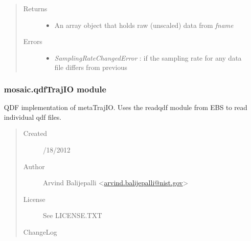 \documentclass[letterpaper,10pt,english]{sphinxmanual}
\begin{document}
\begin{fulllineitems}
\begin{fulllineitems}
\begin{quote}
\begin{description}
\begin{itemize}
\end{itemize}

\item[{Returns}] \leavevmode\begin{itemize}
\item {} 
An array object that holds raw (unscaled) data from \emph{fname}

\end{itemize}

\item[{Errors}] \leavevmode\begin{itemize}
\item {} 
\emph{SamplingRateChangedError} : if the sampling rate for any data file differs from previous

\end{itemize}

\end{description}\end{quote}

\end{fulllineitems}


\end{fulllineitems}



\subsubsection{mosaic.qdfTrajIO module}
\label{api-doc/mosaic.traj:mosaic-qdftrajio-module}\label{api-doc/mosaic.traj:module-mosaic.qdfTrajIO}
QDF implementation of metaTrajIO. Uses the readqdf module from EBS to 
read individual qdf files.
\begin{quote}\begin{description}
\item[{Created}] /18/2012

\item[{Author}] \leavevmode
Arvind Balijepalli \textless{}\href{mailto:arvind.balijepalli@nist.gov}{arvind.balijepalli@nist.gov}\textgreater{}

\item[{License}] \leavevmode
See LICENSE.TXT

\item[{ChangeLog}] \leavevmode
\end{description}\end{quote}
\end{document}
